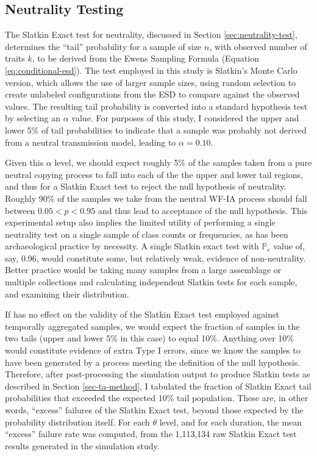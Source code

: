 \subsection{Neutrality Testing}
\label{sec:slatkin-ta-effects}

The Slatkin Exact test for neutrality, discussed in Section \ref{sec:neutrality-test}, determines the ``tail'' probability for a sample of size $n$, with observed number of traits $k$, to be derived from the Ewens Sampling Formula (Equation \ref{eq:conditional-esd}).  The test employed in this study is Slatkin's Monte Carlo version, which allows the use of larger sample sizes, using random selection to create unlabeled configurations from the ESD to compare against the observed values.  The resulting tail probability is converted into a standard hypothesis test by selecting an $\alpha$ value.  For purposes of this study, I considered the upper and lower 5\% of tail probabilities to indicate that a sample was probably not derived from a neutral transmission model, leading to $\alpha = 0.10$.  

Given this $\alpha$ level, we should expect roughly 5\% of the samples taken from a pure neutral copying process to fall into each of the the upper and lower tail regions, and thus for a Slatkin Exact test to reject the null hypothesis of neutrality.  Roughly 90\% of the samples we take from the neutral WF-IA process should fall between $0.05 < p < 0.95$ and thus lead to acceptance of the null hypothesis.  This experimental setup also implies the limited utility of performing a single neutrality test on a single sample of class counts or frequencies, as has been archaeological practice by necessity.  A single Slatkin exact test with $\mathbb{P}_e$ value of, say, 0.96, would constitute some, but relatively weak, evidence of non-neutrality.  Better practice would be taking many samples from a large assemblage or multiple collections and calculating independent Slatkin tests for each sample, and examining their distribution.  

If \timeav has no effect on the validity of the Slatkin Exact test employed against temporally aggregated samples, we would expect the fraction of samples in the two tails (upper and lower 5\% in this case) to equal 10\%.  Anything over 10\% would constitute evidence of extra Type I errors, since we know the samples to have been generated by a process meeting the definition of the null hypothesis.  Therefore, after post-processing the simulation output to produce Slatkin tests as described in Section \ref{sec-ta-method}, I tabulated the fraction of Slatkin Exact tail probabilities that exceeded the expected 10\% tail population.  These are, in other words, ``excess'' failures of the Slatkin Exact test, beyond those expected by the probability distribution itself.  For each $\theta$ level, and for each \timeav duration, the mean ``excess'' failure rate was computed, from the 1,113,134 raw Slatkin Exact test results generated in the simulation study.  

